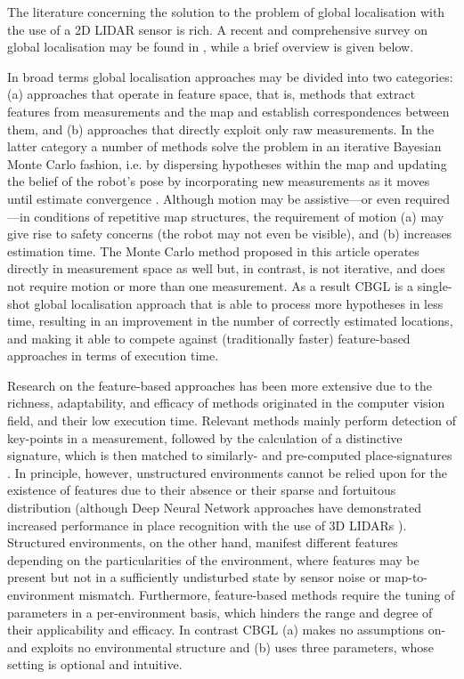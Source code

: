 The literature concerning the solution to the problem of global localisation
with the use of a 2D LIDAR sensor is rich. A recent and comprehensive survey on
global localisation may be found in \cite{gl_survey_cn}, while a brief overview
is given below.

In broad terms global localisation approaches may be divided into two
categories: (a) approaches that operate in feature space, that is, methods that
extract features from measurements and the map and establish correspondences
between them, and (b) approaches that directly exploit only raw measurements.
In the latter category a number of methods solve the problem in an iterative
Bayesian Monte Carlo fashion, i.e. by dispersing hypotheses within the map and
updating the belief of the robot's pose by incorporating new measurements as it
moves until estimate convergence
\cite{mcl,Wang2018d,Yilmaz2019a,gmcl,Chen2021a}.
Although motion may be assistive---or even required---in conditions of
repetitive map structures, the requirement of motion (a) may give
rise to safety concerns (the robot may not even be visible), and (b) increases
estimation time. The Monte Carlo method proposed in this article operates
directly in measurement space as well but, in contrast, is not iterative, and
does not require motion or more than one measurement. As a result CBGL is a
single-shot global localisation approach that is able to process more
hypotheses in less time, resulting in an improvement in the number of correctly
estimated locations, and making it able to compete against (traditionally
faster) feature-based approaches in terms of execution time.

Research on the feature-based approaches has been more extensive due to the
richness, adaptability, and efficacy of methods originated in the computer
vision field, and their low execution time. Relevant methods mainly perform
detection of key-points in a measurement, followed by the calculation of a
distinctive signature, which is then matched to similarly- and pre-computed
place-signatures
\cite{Kallasi2016a,als_eth,Usman2019,Wang2021b,Meng2021,Hendrikx2021,An2022,Nielsen2023}.
In principle, however, unstructured environments cannot be relied upon for the
existence of features due to their absence or their sparse and fortuitous
distribution (although Deep Neural Network approaches have demonstrated
increased performance in place recognition with the use of 3D LIDARs
\cite{Xu2021,Yin2022,Komorowski2022}). Structured environments, on the other
hand, manifest different features depending on the particularities of the
environment, where features may be present but not in a sufficiently
undisturbed state by sensor noise or map-to-environment mismatch. Furthermore,
feature-based methods require the tuning of parameters in a per-environment
basis, which hinders the range and degree of their applicability and efficacy.
In contrast CBGL (a) makes no assumptions on- and exploits no environmental
structure and (b) uses three parameters, whose setting is optional and
intuitive.

